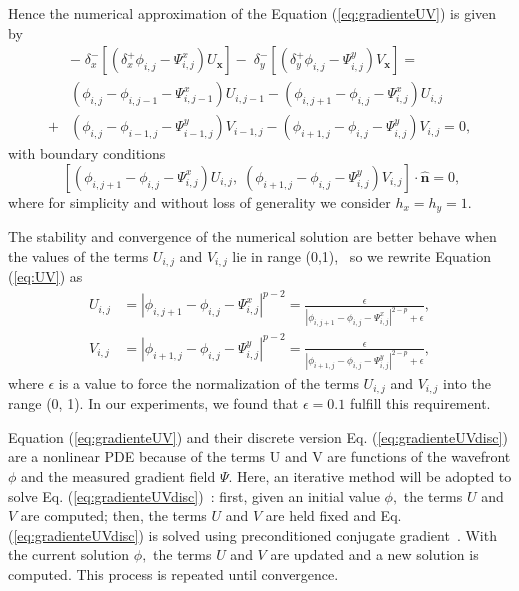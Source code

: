 \documentclass[12pt,letterpaper]{article}
\begin{document}
Hence the numerical approximation of the Equation (\ref{eq:gradienteUV}) is given by 
\begin{equation}\label{eq:gradienteUVdisc}
\begin{aligned}
&- \;\delta_{x}^{-}\left[\left(\delta_{x}^{+}\phi_{i,j} - \Psi_{i,j}^{x}\right) U_{\mathbf{x}} \right] 
- \;\delta_{y}^{-}\left[\left(\delta_{y}^{+}\phi_{i,j} - \Psi_{i,j}^{y}\right) V_{\mathbf{x}} \right] = \\
&\left(\phi_{i,j} - \phi_{i,j-1} - \Psi_{i,j-1}^{x}\right)U_{i,j-1} - \left(\phi_{i,j+1} - \phi_{i,j} - \Psi_{i,j}^{x}\right)U_{i,j}\\
  + &\left(\phi_{i,j} - \phi_{i-1,j} - \Psi_{i-1,j}^{y}\right)V_{i-1,j} - \left(\phi_{i+1,j} - \phi_{i,j}  - \Psi_{i,j}^{y}\right)V_{i,j}
  = 0,
\end{aligned}
\end{equation}
with boundary conditions
\[\;\left[ \left(\phi_{i,j+1} - \phi_{i,j} - \Psi_{i,j}^{x}\right) U_{i,j}, \;\left(\phi_{i+1,j} - \phi_{i,j}  - \Psi_{i,j}^{y}\right) V_{i,j}\right] \cdot \hat{\mathbf{n}} = 0,\]  where for simplicity and without loss of generality we consider $h_x = h_y  = 1.$

The stability and convergence of the numerical solution are better behave when the values of the terms $U_{i,j}$ and $V_{i,j}$ lie in range (0,1),~\cite{Bloomfield1983,Scales1988,Ghiglia1996} so we rewrite Equation (\ref{eq:UV}) as 
\begin{equation}\label{eq:UVnorm}
\begin{aligned}
U_{i,j} &= \left\lvert\phi_{i,j+1}-\phi_{i,j} - \Psi_{i,j}^{x}\right\rvert^{p-2}
= \frac{\epsilon }{\left\lvert\phi_{i,j+1}-\phi_{i,j} - \Psi_{i,j}^{x}\right\rvert^{2-p} + \epsilon},\\
V_{i,j} &= \left\lvert\phi_{i+1,j}-\phi_{i,j} - \Psi_{i,j}^{y}\right\rvert^{p-2}
= \frac{\epsilon }{\left\lvert\phi_{i+1,j}-\phi_{i,j} - \Psi_{i,j}^{y}\right\rvert^{2-p} + \epsilon},
\end{aligned}
\end{equation}
where $\epsilon$ is a value to force the normalization of the terms $U_{i,j}$ and $V_{i,j}$ into the range (0, 1). In our experiments, we found that $\epsilon = 0.1$ fulfill this requirement.

Equation (\ref{eq:gradienteUV}) and their discrete version Eq. (\ref{eq:gradienteUVdisc})  are a nonlinear PDE because of the terms U and V are functions of the wavefront $\phi$ and the measured gradient field $\Psi.$ Here, an iterative method will be adopted to solve Eq. (\ref{eq:gradienteUVdisc})~\cite{Bloomfield1983,Scales1988}: first, given an initial value $\phi,$ the terms $U$ and $V$ are computed; then, the terms $U$ and $V$ are held fixed and Eq. (\ref{eq:gradienteUVdisc}) is solved using preconditioned conjugate gradient~\cite{Shewchuk1994,Golub1996}. With the current solution $\phi,$ the terms $U$ and $V$ are updated and a new solution is computed. This process is repeated until convergence. 
\end{document}
